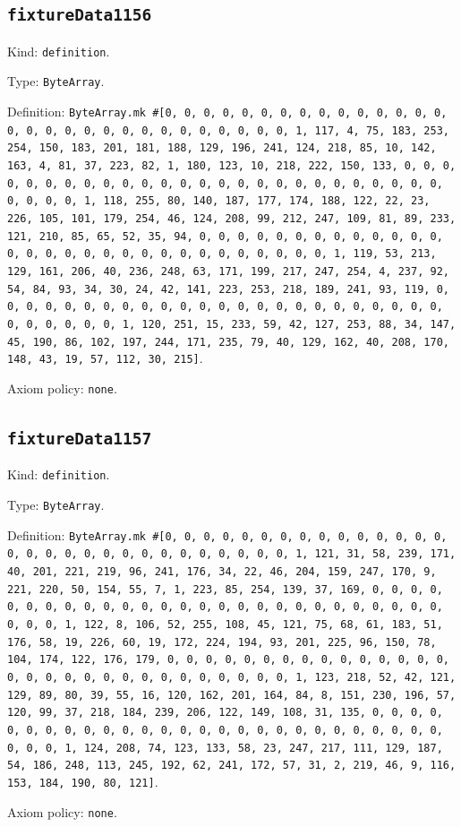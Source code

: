 \documentclass[11pt]{article}
\begin{document}
\subsection*{\texttt{fixtureData1156}}
\noindent Kind: \texttt{definition}.\par
\noindent Type: \texttt{ByteArray}.\par
\noindent Definition: \texttt{ByteArray.mk \#[0, 0, 0, 0, 0, 0, 0, 0, 0, 0, 0, 0, 0, 0, 0, 0, 0, 0, 0, 0, 0, 0, 0, 0, 0, 0, 0, 0, 0, 0, 1, 117, 4, 75, 183, 253, 254, 150, 183, 201, 181, 188, 129, 196, 241, 124, 218, 85, 10, 142, 163, 4, 81, 37, 223, 82, 1, 180, 123, 10, 218, 222, 150, 133, 0, 0, 0, 0, 0, 0, 0, 0, 0, 0, 0, 0, 0, 0, 0, 0, 0, 0, 0, 0, 0, 0, 0, 0, 0, 0, 0, 0, 0, 0, 1, 118, 255, 80, 140, 187, 177, 174, 188, 122, 22, 23, 226, 105, 101, 179, 254, 46, 124, 208, 99, 212, 247, 109, 81, 89, 233, 121, 210, 85, 65, 52, 35, 94, 0, 0, 0, 0, 0, 0, 0, 0, 0, 0, 0, 0, 0, 0, 0, 0, 0, 0, 0, 0, 0, 0, 0, 0, 0, 0, 0, 0, 0, 0, 1, 119, 53, 213, 129, 161, 206, 40, 236, 248, 63, 171, 199, 217, 247, 254, 4, 237, 92, 54, 84, 93, 34, 30, 24, 42, 141, 223, 253, 218, 189, 241, 93, 119, 0, 0, 0, 0, 0, 0, 0, 0, 0, 0, 0, 0, 0, 0, 0, 0, 0, 0, 0, 0, 0, 0, 0, 0, 0, 0, 0, 0, 0, 0, 1, 120, 251, 15, 233, 59, 42, 127, 253, 88, 34, 147, 45, 190, 86, 102, 197, 244, 171, 235, 79, 40, 129, 162, 40, 208, 170, 148, 43, 19, 57, 112, 30, 215]}.\par
\noindent Axiom policy: \texttt{none}.\par
\subsection*{\texttt{fixtureData1157}}
\noindent Kind: \texttt{definition}.\par
\noindent Type: \texttt{ByteArray}.\par
\noindent Definition: \texttt{ByteArray.mk \#[0, 0, 0, 0, 0, 0, 0, 0, 0, 0, 0, 0, 0, 0, 0, 0, 0, 0, 0, 0, 0, 0, 0, 0, 0, 0, 0, 0, 0, 0, 1, 121, 31, 58, 239, 171, 40, 201, 221, 219, 96, 241, 176, 34, 22, 46, 204, 159, 247, 170, 9, 221, 220, 50, 154, 55, 7, 1, 223, 85, 254, 139, 37, 169, 0, 0, 0, 0, 0, 0, 0, 0, 0, 0, 0, 0, 0, 0, 0, 0, 0, 0, 0, 0, 0, 0, 0, 0, 0, 0, 0, 0, 0, 0, 1, 122, 8, 106, 52, 255, 108, 45, 121, 75, 68, 61, 183, 51, 176, 58, 19, 226, 60, 19, 172, 224, 194, 93, 201, 225, 96, 150, 78, 104, 174, 122, 176, 179, 0, 0, 0, 0, 0, 0, 0, 0, 0, 0, 0, 0, 0, 0, 0, 0, 0, 0, 0, 0, 0, 0, 0, 0, 0, 0, 0, 0, 0, 0, 1, 123, 218, 52, 42, 121, 129, 89, 80, 39, 55, 16, 120, 162, 201, 164, 84, 8, 151, 230, 196, 57, 120, 99, 37, 218, 184, 239, 206, 122, 149, 108, 31, 135, 0, 0, 0, 0, 0, 0, 0, 0, 0, 0, 0, 0, 0, 0, 0, 0, 0, 0, 0, 0, 0, 0, 0, 0, 0, 0, 0, 0, 0, 0, 1, 124, 208, 74, 123, 133, 58, 23, 247, 217, 111, 129, 187, 54, 186, 248, 113, 245, 192, 62, 241, 172, 57, 31, 2, 219, 46, 9, 116, 153, 184, 190, 80, 121]}.\par
\noindent Axiom policy: \texttt{none}.\par
\end{document}
